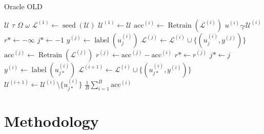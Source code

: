 \documentclass[]{article}
\begin{document}
\begin{algorithm}
	\caption{Oracle {\color{red} OLD}}\label{alg:oracle}
	\begin{algorithmic}[1]
		\Require $\mathcal{U}$ 
		\Require $\tau$ 
		\Require $\Omega$ 
		\Require $\omega$ 
		\State $\mathcal{L}^{(1)} \gets \operatorname{seed}(\mathcal{U})$  
		\State $\mathcal{U}^{(1)} \gets \mathcal{U}$
			\State $\text{acc}^{(i)} \gets \operatorname{Retrain}(\mathcal{L}^{(i)})$  
			\State $u^{(i)} \underset{\tau}{\sim} \mathcal{U}^{(i)}$
			\State $r* \gets -\infty$
			\State $j* \gets -1$
			 
				\State $y^{(j)} \gets \operatorname{label}(u^{(i)}_{j})$
				\State $\mathcal{L}^{(j)} \gets \mathcal{L}^{(i)} \cup \{(u^{(i)}_j, y^{(j)})\}$
				\State $\text{acc}^{(j)} \gets \operatorname{Retrain}(\mathcal{L}^{(j)})$  
				\State $r^{(j)} \gets \text{acc}^{(j)} - \text{acc}^{(i)}$
				 
					\State $r* \gets r^{(j)}$
					\State $j* \gets j$
				\EndIf  
			\EndFor
			\State $y^{(i)} \gets \operatorname{label}(u^{(i)}_{j*})$
			\State $\mathcal{L}^{(i+1)} \gets \mathcal{L}^{(i)} \cup \{(u^{(i)}_{j*}, y^{(i)})\}$
			\State $\mathcal{U}^{(i+1)} \gets \mathcal{U}^{(i)} \setminus \{u^{(i)}_{j*}\}$
		\EndFor
		\State
		\Return $\frac{1}{B} \sum_{i=1}^{B} \text{acc}^{(i)}$
	\end{algorithmic}
\end{algorithm}

\section{Methodology}

\end{document}
